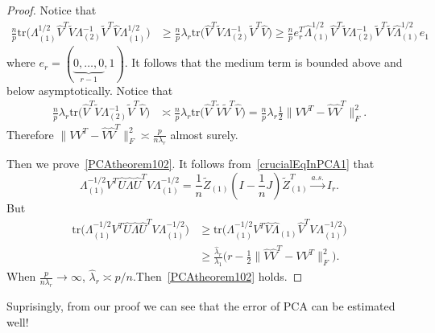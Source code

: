 \begin{proof}
    Notice that
    \begin{equation*}
        \begin{aligned}
         \frac{n}{p}   \mathrm{tr}\big(\Lambda_{(1)}^{1/2}\hat{V}^T \tilde{V}\Lambda^{-1}_{(2)}\tilde{V}^T \hat{V}\Lambda_{(1)}^{1/2}\big)&\geq
          \frac{n}{p}  \lambda_r\mathrm{tr}\big(\hat{V}^T \tilde{V}\Lambda^{-1}_{(2)}\tilde{V}^T \hat{V}\big)
            \geq
          \frac{n}{p}  e_r^T \hat{\Lambda}_{(1)}^{1/2}\hat{V}^T\tilde{V}\Lambda_{(2)}^{-1}\tilde{V}^T\tilde{V}\hat{\Lambda}_{(1)}^{1/2}e_1
        \end{aligned}
    \end{equation*}
    where $e_r=(\underbrace{0,\ldots,0}_{r-1},1)$. It follows that the medium term is bounded above and below asymptotically. Notice that
    \begin{equation*}
        \begin{aligned}
            \frac{n}{p}\lambda_r\mathrm{tr}\big(\hat{V}^T \tilde{V}\Lambda^{-1}_{(2)}\tilde{V}^T \hat{V}\big)
            &\asymp
            \frac{n}{p}\lambda_r\mathrm{tr}\big(\hat{V}^T \tilde{V}\tilde{V}^T \hat{V}\big)
            =\frac{n}{p}\lambda_r\frac{1}{2}\|VV^T -\hat{V}\hat{V}^T\|^2_F.
        \end{aligned}
    \end{equation*}
     Therefore
    $\|VV^T -\hat{V}\hat{V}^T\|^2_F\asymp \frac{p}{n\lambda_r}$ almost surely.

    Then we prove~\eqref{PCAtheorem102}. It follows from~\eqref{crucialEqInPCA1} that
    \begin{equation}\label{crucialEqInPCA2}
        \Lambda^{-1/2}_{(1)}V^T \hat{U}\hat{\Lambda}\hat{U}^T V\Lambda^{-1/2}_{(1)}=
        \frac{1}{n}\tilde{Z}_{(1)}(I-\frac{1}{n}J)\tilde{Z}_{(1)}^T\xrightarrow{a.s.} I_{r}.
    \end{equation}
But
    \begin{equation}
        \begin{aligned}
        \mathrm{tr}\big(\Lambda^{-1/2}_{(1)}V^T \hat{U}\hat{\Lambda}\hat{U}^T V\Lambda^{-1/2}_{(1)}\big)
            &\geq
        \mathrm{tr}\big(\Lambda^{-1/2}_{(1)}V^T \hat{V}\hat{\Lambda}_{(1)}\hat{V}^T V\Lambda^{-1/2}_{(1)}\big)
            \\
            &\geq
            \frac{\hat{\lambda}_r}{\lambda_1}\Big(r-\frac{1}{2}\|\hat{V}\hat{V}^T-VV^T\|^2_F\Big).
        \end{aligned}
    \end{equation}
When $\frac{p}{n\lambda_r}\to \infty$, $\hat{\lambda}_r\asymp p/n$.Then~\eqref{PCAtheorem102} holds.

\end{proof}



Suprisingly, from our proof we can see that the error of PCA can be estimated well!
